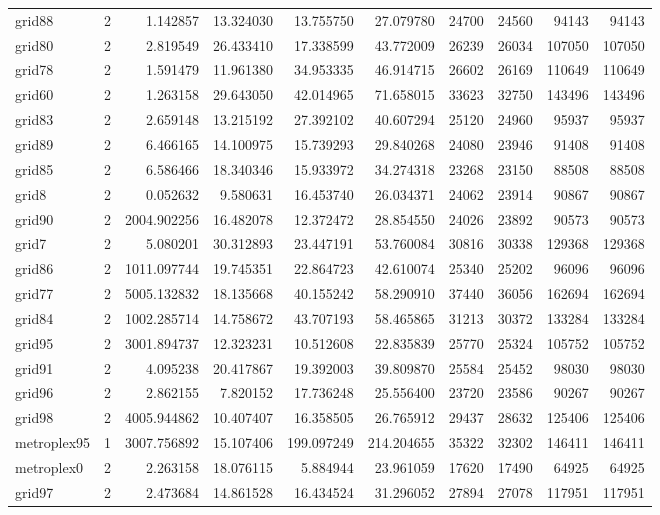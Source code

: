 \begin{longtable}{|l|r|r|r|r|r|r|r|r|r|}
grid88 & 2 & 1.142857 & 13.324030 & 13.755750 & 27.079780 & 24700 & 24560 & 94143 & 94143 \\
grid80 & 2 & 2.819549 & 26.433410 & 17.338599 & 43.772009 & 26239 & 26034 & 107050 & 107050 \\
grid78 & 2 & 1.591479 & 11.961380 & 34.953335 & 46.914715 & 26602 & 26169 & 110649 & 110649 \\
grid60 & 2 & 1.263158 & 29.643050 & 42.014965 & 71.658015 & 33623 & 32750 & 143496 & 143496 \\
grid83 & 2 & 2.659148 & 13.215192 & 27.392102 & 40.607294 & 25120 & 24960 & 95937 & 95937 \\
grid89 & 2 & 6.466165 & 14.100975 & 15.739293 & 29.840268 & 24080 & 23946 & 91408 & 91408 \\
grid85 & 2 & 6.586466 & 18.340346 & 15.933972 & 34.274318 & 23268 & 23150 & 88508 & 88508 \\
grid8 & 2 & 0.052632 & 9.580631 & 16.453740 & 26.034371 & 24062 & 23914 & 90867 & 90867 \\
grid90 & 2 & 2004.902256 & 16.482078 & 12.372472 & 28.854550 & 24026 & 23892 & 90573 & 90573 \\
grid7 & 2 & 5.080201 & 30.312893 & 23.447191 & 53.760084 & 30816 & 30338 & 129368 & 129368 \\
grid86 & 2 & 1011.097744 & 19.745351 & 22.864723 & 42.610074 & 25340 & 25202 & 96096 & 96096 \\
grid77 & 2 & 5005.132832 & 18.135668 & 40.155242 & 58.290910 & 37440 & 36056 & 162694 & 162694 \\
grid84 & 2 & 1002.285714 & 14.758672 & 43.707193 & 58.465865 & 31213 & 30372 & 133284 & 133284 \\
grid95 & 2 & 3001.894737 & 12.323231 & 10.512608 & 22.835839 & 25770 & 25324 & 105752 & 105752 \\
grid91 & 2 & 4.095238 & 20.417867 & 19.392003 & 39.809870 & 25584 & 25452 & 98030 & 98030 \\
grid96 & 2 & 2.862155 & 7.820152 & 17.736248 & 25.556400 & 23720 & 23586 & 90267 & 90267 \\
grid98 & 2 & 4005.944862 & 10.407407 & 16.358505 & 26.765912 & 29437 & 28632 & 125406 & 125406 \\
metroplex95 & 1 & 3007.756892 & 15.107406 & 199.097249 & 214.204655 & 35322 & 32302 & 146411 & 146411 \\
metroplex0 & 2 & 2.263158 & 18.076115 & 5.884944 & 23.961059 & 17620 & 17490 & 64925 & 64925 \\
grid97 & 2 & 2.473684 & 14.861528 & 16.434524 & 31.296052 & 27894 & 27078 & 117951 & 117951 \\

\end{longtable}
